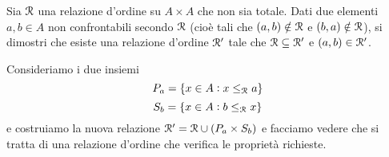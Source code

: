 \begin{es}
  Sia $ \mathcal{R} $ una relazione d'ordine su $ A \times A $ che non sia totale. Dati due elementi $ a, b \in A $ non confrontabili secondo $ \mathcal{R} $ (cioè tali che $ (a, b) \notin \mathcal{R} $ e $ (b, a) \notin \mathcal{R} $), si dimostri che esiste una relazione d'ordine $ \mathcal{R}' $ tale che $ \mathcal{R} \subseteq \mathcal{R}' $ e $ (a, b) \in \mathcal{R}' $.
\end{es}
Consideriamo i due insiemi
\[P_a = \{x \in A : x \leq_{\mathcal{R}} a\}\]
\[S_b = \{x \in A : b \leq_{\mathcal{R}} x\}\]
e costruiamo la nuova relazione $ \mathcal{R}' = \mathcal{R} \cup (P_a \times S_b) $ e facciamo vedere che si tratta di una relazione d'ordine che verifica le proprietà richieste.
